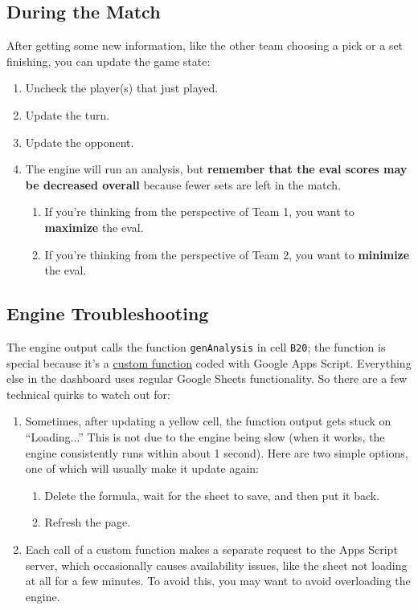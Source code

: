 \documentclass[12pt]{article}
\begin{document}
		\subsection{During the Match}
			After getting some new information, like the other team choosing a pick or a set finishing, you can update the game state:
			\begin{enumerate}
				\item Uncheck the player(s) that just played.
				\item Update the turn.
				\item Update the opponent.
				\item The engine will run an analysis, but \textbf{remember that the eval scores may be decreased overall} because fewer sets are left in the match.
				\begin{enumerate}
					\item If you're thinking from the perspective of Team 1, you want to \textbf{maximize} the eval.
					\item If you're thinking from the perspective of Team 2, you want to \textbf{minimize} the eval.
				\end{enumerate}
			\end{enumerate}
	
		\subsection{Engine Troubleshooting}
			The engine output calls the function \texttt{genAnalysis} in cell \texttt{B20}; the function is special because it's a \href{https://developers.google.com/apps-script/guides/sheets/functions}{custom function} coded with Google Apps Script. Everything else in the dashboard uses regular Google Sheets functionality. So there are a few technical quirks to watch out for:
			\begin{enumerate}
				\item Sometimes, after updating a yellow cell, the function output gets stuck on ``Loading...'' This is not due to the engine being slow (when it works, the engine consistently runs within about 1 second). Here are two simple options, one of which will usually make it update again:
				\begin{enumerate}
					\item Delete the formula, wait for the sheet to save, and then put it back.
					\item Refresh the page.
				\end{enumerate}
				\item Each call of a custom function makes a separate request to the Apps Script server, which occasionally causes availability issues, like the sheet not loading at all for a few minutes. To avoid this, you may want to avoid overloading the engine.
			\end{enumerate}
\end{document}
